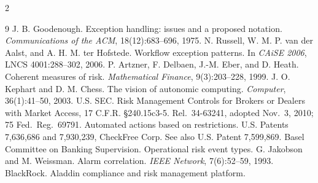 \documentclass[11pt]{article}
\begin{document}
\scriptsize
\begin{multicols}{2}
\begin{thebibliography}{9}
\setlength{\itemsep}{0pt}
 J. B. Goodenough. Exception handling: issues and a proposed notation.
  \emph{Communications of the ACM}, 18(12):683--696, 1975.
 N. Russell, W. M. P. van der Aalst, and A. H. M. ter Hofstede. Workflow
  exception patterns. In \emph{CAiSE 2006}, LNCS 4001:288--302, 2006.
 P. Artzner, F. Delbaen, J.-M. Eber, and D. Heath. Coherent measures of
  risk. \emph{Mathematical Finance}, 9(3):203--228, 1999.
 J. O. Kephart and D. M. Chess. The vision of autonomic computing.
  \emph{Computer}, 36(1):41--50, 2003.
 U.S. SEC. Risk Management Controls for Brokers or Dealers with Market
  Access, 17 C.F.R. \S 240.15c3-5. Rel.\ 34-63241, adopted Nov.\ 3, 2010; 75 Fed.\ Reg.\ 69791.
 Automated actions based on restrictions. U.S. Patents 7,636,686 and
  7,930,239, CheckFree Corp. See also U.S. Patent 7,599,869.
 Basel Committee on Banking Supervision. Operational risk event types. %
 G. Jakobson and M. Weissman. Alarm correlation. \emph{IEEE Network},
  7(6):52--59, 1993. %
 BlackRock. Aladdin compliance and risk management platform.
\end{thebibliography}
\end{multicols}
\end{document}
